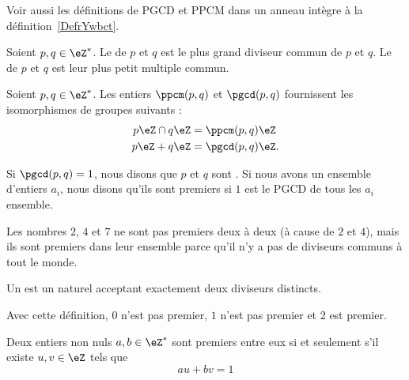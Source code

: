 Voir aussi les définitions de PGCD et PPCM dans un anneau intègre à la définition~\ref{DefrYwbct}.

\begin{definition}
    Soient \( p,q\in\eZ^*\). Le  de \( p\) et \( q\) est le plus grand diviseur commun de \( p\) et \( q\). Le  de \( p\) et \( q\) est leur plus petit multiple commun.
\end{definition}

\begin{lemma}
    Soient \( p,q\in\eZ^*\). Les entiers \( \ppcm(p,q)\) et \( \pgcd(p,q)\) fournissent les isomorphismes de groupes suivants :
\begin{subequations}
    \begin{align}
        p\eZ\cap q\eZ&=\ppcm(p,q)\eZ\\
        p\eZ + q\eZ&=\pgcd(p,q)\eZ.
    \end{align}
\end{subequations}
\end{lemma}

\begin{definition}  \label{DefZHRXooNeWIcB}
    Si \( \pgcd(p,q)=1\), nous disons que \( p\) et \( q\) sont . Si nous avons un ensemble d'entiers \( a_i\), nous disons qu'ils sont premiers  si \( 1\) est le PGCD de tous les \( a_i\) ensemble.
\end{definition}

Les nombres \( 2\), \( 4\) et \( 7\) ne sont pas premiers deux à deux (à cause de \( 2\) et \( 4\)), mais ils sont premiers dans leur ensemble parce qu'il n'y a pas de diviseurs communs à tout le monde.

\begin{definition}
    Un  est un naturel acceptant exactement deux diviseurs distincts.
\end{definition}
Avec cette définition, \( 0\) n'est pas premier, \( 1\) n'est pas premier et \( 2\) est premier.

\begin{theorem} \label{ThoBuNjam}
    Deux entiers non nuls \( a,b\in\eZ^*\) sont premiers entre eux si et seulement s'il existe \( u,v\in\eZ\) tels que
    \begin{equation}
        au+bv=1
    \end{equation}
\end{theorem}

